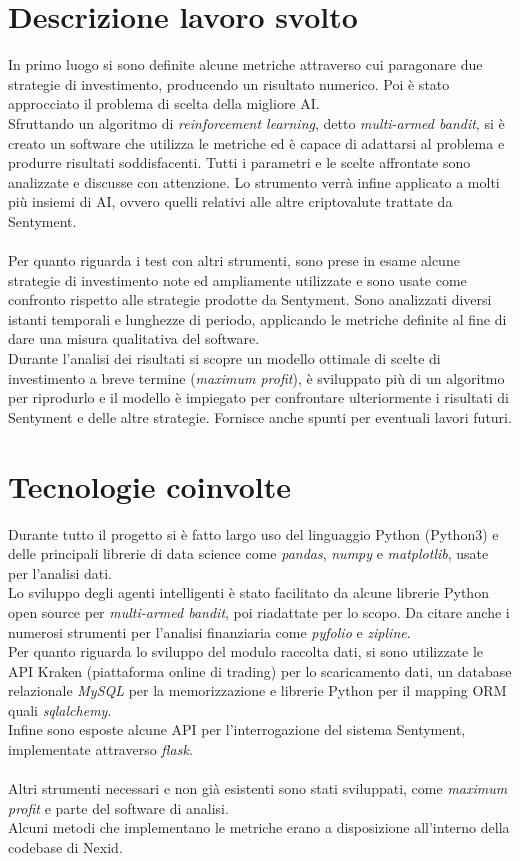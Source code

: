 \documentclass{article}
\begin{document}
\section{Descrizione lavoro svolto}
In primo luogo si sono definite alcune metriche attraverso cui paragonare due strategie di investimento, producendo un risultato numerico. Poi è stato approcciato il problema di scelta della migliore AI.\\ Sfruttando un algoritmo di \textit{reinforcement learning}, detto \textit{multi-armed bandit}, si è creato un software che utilizza le metriche ed è capace di adattarsi al problema e produrre risultati soddisfacenti. Tutti i parametri e le scelte affrontate sono analizzate e discusse con attenzione. Lo strumento verrà infine applicato a molti più insiemi di AI, ovvero quelli relativi alle altre criptovalute trattate da Sentyment.\\~\\ Per quanto riguarda i test con altri strumenti, sono prese in esame alcune strategie di investimento note ed ampliamente utilizzate e sono usate come confronto rispetto alle strategie prodotte da Sentyment. Sono analizzati diversi istanti temporali e lunghezze di periodo, applicando le metriche definite al fine di dare una misura qualitativa del software.\\ Durante l'analisi dei risultati si scopre un modello ottimale di scelte di investimento a breve termine (\textit{maximum profit}), è sviluppato più di un algoritmo per riprodurlo e il modello è impiegato per confrontare ulteriormente i risultati di Sentyment e delle altre strategie. Fornisce anche spunti per eventuali lavori futuri.

\section{Tecnologie coinvolte}
Durante tutto il progetto si è fatto largo uso del linguaggio Python (Python3) e delle principali librerie di data science come \textit{pandas}, \textit{numpy} e \textit{matplotlib}, usate per l'analisi dati. \\ Lo sviluppo degli agenti intelligenti è stato facilitato da alcune librerie Python open source per \textit{multi-armed bandit}, poi riadattate per lo scopo. Da citare anche i numerosi strumenti per l'analisi finanziaria come \textit{pyfolio} e \textit{zipline}.\\ Per quanto riguarda lo sviluppo del modulo raccolta dati, si sono utilizzate le API Kraken (piattaforma online di trading) per lo scaricamento dati, un database relazionale \textit{MySQL} per la memorizzazione e librerie Python per il mapping ORM quali \textit{sqlalchemy}. \\ Infine sono esposte alcune API per l'interrogazione del sistema Sentyment, implementate attraverso \textit{flask}.\\~\\ Altri strumenti necessari e non già esistenti sono stati sviluppati, come \textit{maximum profit} e parte del software di analisi.\\ Alcuni metodi che implementano le metriche erano a disposizione all'interno della codebase di Nexid.
\end{document}
